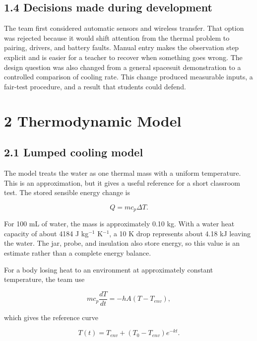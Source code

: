 \documentclass[10pt,conference,a4paper]{IEEEtran}
\begin{document}
\subsection*{1.4 Decisions made during development}

The team first considered automatic sensors and wireless transfer. That option was rejected because it would shift attention from the thermal problem to pairing, drivers, and battery faults. Manual entry makes the observation step explicit and is easier for a teacher to recover when something goes wrong. The design question was also changed from a general spacesuit demonstration to a controlled comparison of cooling rate. This change produced measurable inputs, a fair-test procedure, and a result that students could defend.

\section*{2 Thermodynamic Model}

\subsection*{2.1 Lumped cooling model}

The model treats the water as one thermal mass with a uniform temperature. This is an approximation, but it gives a useful reference for a short classroom test. The stored sensible energy change is

\begin{equation}Q = m c_p \Delta T.\end{equation}

For 100 mL of water, the mass is approximately 0.10 kg. With a water heat capacity of about 4184 J kg$^{-1}$ K$^{-1}$, a 10 K drop represents about 4.18 kJ leaving the water. The jar, probe, and insulation also store energy, so this value is an estimate rather than a complete energy balance.

For a body losing heat to an environment at approximately constant temperature, the team use

\begin{equation}m c_p \frac{dT}{dt} = -hA(T-T_{env}),\end{equation}

which gives the reference curve

\begin{equation}T(t)=T_{env}+(T_0-T_{env})e^{-kt}.\end{equation}
\end{document}
